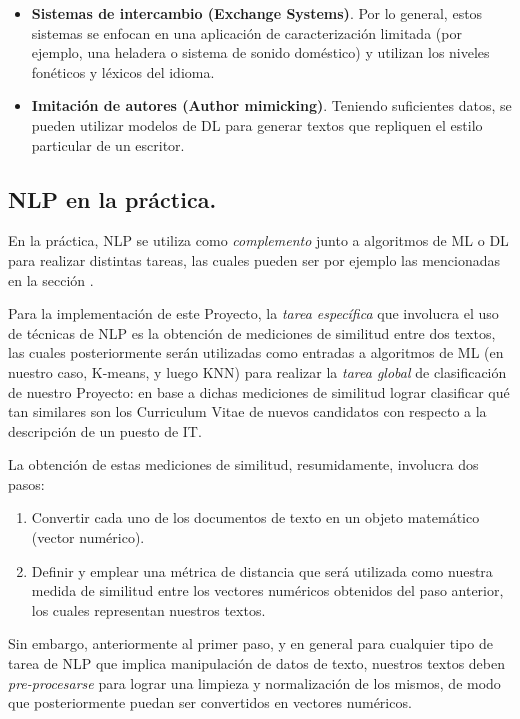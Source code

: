 \documentclass[12pt,a4paper]{article}
\begin{document}
\begin{sloppypar}
\begin{itemize}
\item \textbf{Sistemas de intercambio (Exchange Systems)}. Por lo general, estos sistemas se enfocan en una aplicación de caracterización limitada (por ejemplo, una heladera o sistema de sonido doméstico) y utilizan los niveles fonéticos y léxicos del idioma. 

\item \textbf{Imitación de autores (Author mimicking)}. Teniendo suficientes datos, se pueden utilizar modelos de DL para generar textos que repliquen el estilo particular de un escritor.
\end{itemize}

\cleardoublepage

\subsection{NLP en la práctica.}\label{Practica_NLP}

En la práctica, NLP se utiliza como \textit{complemento} junto a algoritmos de ML o DL para realizar distintas tareas, las cuales pueden ser por ejemplo las mencionadas en la sección  \textit{}.

Para la implementación de este Proyecto, la \textit{tarea específica} que involucra el uso de técnicas de NLP es la obtención de mediciones de similitud entre dos textos, las cuales posteriormente serán utilizadas como entradas a algoritmos de ML (en nuestro caso, K-means, y luego KNN) para realizar la \textit{tarea global} de clasificación de nuestro Proyecto: en base a dichas mediciones de similitud lograr clasificar qué tan similares son los Curriculum Vitae de nuevos candidatos con respecto a la descripción de un puesto de IT.

La obtención de estas mediciones de similitud, resumidamente, involucra dos pasos\cite{Similarity_calculation}:
\begin{enumerate}
\item Convertir cada uno de los documentos de texto en un objeto matemático (vector numérico).
\item Definir y emplear una métrica de distancia que será utilizada como nuestra medida de similitud entre los vectores numéricos obtenidos del paso anterior, los cuales representan nuestros textos.
\end{enumerate}

Sin embargo, anteriormente al primer paso, y en general para cualquier tipo de tarea de NLP que implica manipulación de datos de texto, nuestros textos deben \textit{pre-procesarse} para lograr una limpieza y normalización de los mismos, de modo que posteriormente puedan ser convertidos en vectores numéricos\cite{NLP_2}.


\end{sloppypar}
\end{document}
